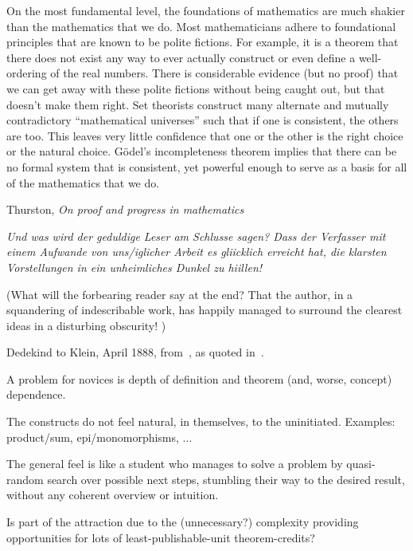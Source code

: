 \documentclass[11pt,openany]{article}
\begin{document}
\epigraph{On the most fundamental level, the foundations of mathematics are much shakier
than the mathematics that we do. Most mathematicians adhere to foundational
principles that are known to be polite fictions. For example, it is a theorem that
there does not exist any way to ever actually construct or even define a well-ordering
of the real numbers. There is considerable evidence (but no proof) that we can get
away with these polite fictions without being caught out, but that doesn’t make
them right. Set theorists construct many alternate and mutually contradictory
“mathematical universes” such that if one is consistent, the others are too. This
leaves very little confidence that one or the other is the right choice or the natural
choice. G\"{o}del’s incompleteness theorem implies that there can be no formal system
that is consistent, yet powerful enough to serve as a basis for all of the mathematics
that we do.}%
{Thurston, \textit{On proof and progress in mathematics}~\cite{thurston1994proof}}

\label{sec:Complexity}

\epigraph{
\textsl{Und was wird der geduldige Leser am
Schlusse sagen? Dass der Verfasser mit einem Aufwande von uns/iglicher Arbeit es gliicklich
erreicht hat, die klarsten Vorstellungen in ein unheimliches Dunkel zu hiillen!}
\par
(What will the forbearing reader say at the end? That the author, in a squandering of indescribable
work, has happily managed to surround the clearest ideas in a disturbing obscurity!
)}%
{Dedekind to Klein, April 1888, 
from~\cite{dugac1976DedekindFondements},
as quoted in~\cite{ferreiros2007labyrinth}.}

A problem for novices is depth of definition and theorem
(and, worse, concept) dependence.

The constructs do not feel natural, in themselves, 
to the uninitiated.
Examples: product/sum, epi/monomorphisms, ...

The general feel is like a student who manages to solve a problem
by quasi-random search over possible next steps,
stumbling their way to the desired result,
without any coherent overview or intuition.

Is part of the attraction due to the (unnecessary?)
complexity providing opportunities for lots of
least-publishable-unit theorem-credits?

\label{sec:Abstraction-losses}
\end{document}
